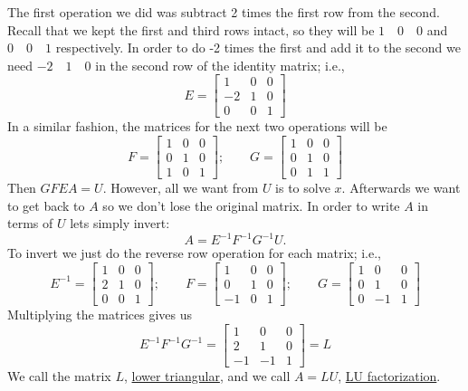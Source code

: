 \documentclass[reqno]{amsart}
\theoremstyle{definition}
\begin{document}
The first operation we did was subtract 2 times the first row from the second.  Recall that we kept the
first and third rows intact, so they will be $1\quad 0 \quad 0$ and $0 \quad 0\quad 1$ respectively.
In order to do -2 times the first and add it to the second we need $-2\quad 1\quad 0$ in the second
row of the identity matrix; i.e.,
%
\begin{equation}
E = \begin{bmatrix}
1 & 0 & 0\\
-2 & 1 & 0\\
0 & 0 & 1
\end{bmatrix}
\end{equation}
In a similar fashion, the matrices for the next two operations will be
%
\begin{equation}
F = \begin{bmatrix}
1 & 0 & 0\\
0 & 1 & 0\\
1 & 0 & 1
\end{bmatrix};\qquad G = \begin{bmatrix}
1 & 0 & 0\\
0 & 1 & 0\\
0 & 1 & 1
\end{bmatrix}
\end{equation}
%
Then $GFEA = U$.  However, all we want from $U$ is to solve $x$.  Afterwards we want to get back to $A$ so
we don't lose the original matrix.  In order to write $A$ in terms of $U$ lets simply invert:
%
\begin{equation}
A = E^{-1}F^{-1}G^{-1}U.
\end{equation}
%
To invert we just do the reverse row operation for each matrix; i.e.,
%
\begin{equation}
E^{-1} = \begin{bmatrix}
1 & 0 & 0\\
2 & 1 & 0\\
0 & 0 & 1
\end{bmatrix};\qquad
F = \begin{bmatrix}
1 & 0 & 0\\
0 & 1 & 0\\
-1 & 0 & 1
\end{bmatrix};\qquad G = \begin{bmatrix}
1 & 0 & 0\\
0 & 1 & 0\\
0 & -1 & 1
\end{bmatrix}
\end{equation}
%
Multiplying the matrices gives us
%
\begin{equation}
 E^{-1}F^{-1}G^{-1} = \begin{bmatrix}
 1 & 0 & 0\\
 2 & 1 & 0\\
 -1 & -1 & 1
 \end{bmatrix} = L
\end{equation}
%
We call the matrix $L$, \underline{lower triangular}, and we call $A = LU$, \underline{LU factorization}.
\end{document}
